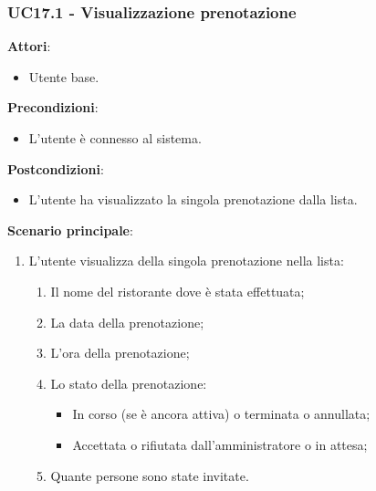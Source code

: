 \subsubsection{UC17.1 - Visualizzazione prenotazione}\label{usecase:17_1}
\textbf{Attori}:
\begin{itemize}
    \item Utente base.
\end{itemize}
\textbf{Precondizioni}:
\begin{itemize}
    \item L'utente è connesso al sistema.
\end{itemize}
\textbf{Postcondizioni}:
\begin{itemize}
    \item L'utente ha visualizzato la singola prenotazione dalla lista.
\end{itemize}
\textbf{Scenario principale}:
\begin{enumerate}
    \item L'utente visualizza della singola prenotazione nella lista:
    \begin{enumerate}
        \item Il nome del ristorante dove è stata effettuata;
        \item La data della prenotazione;
        \item L'ora della prenotazione;
        \item Lo stato della prenotazione:
            \begin{itemize}
                \item In corso (se è ancora attiva) o terminata  o annullata;
                \item Accettata o rifiutata dall'amministratore o in attesa;
            \end{itemize}
        \item Quante persone sono state invitate.
    \end{enumerate}
\end{enumerate}
\newpage